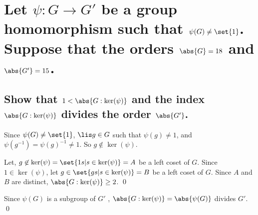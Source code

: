 \section[Problem 3]{Let $\psi : G \to G'$ be a group homomorphism such that
    $\psi(G) \neq \set{1}$. Suppose that the orders $\abs{G} = 18$ and $\abs{G'} = 15$.}
    \subsection[(i)]{Show that $1 < \abs{G:\ker(\psi)}$ and 
        the index $\abs{G:\ker(\psi)}$ divides the order $\abs{G'}$.}


        Since $\psi(G) \neq \set{1}$,
        $\lis g \in G$ such that $\psi(g) \neq 1$,
        and $\psi(g^{-1}) = \psi(g)^{-1} \neq 1$.
        So $g\not \in \ker(\psi)$.

        Let, $g\not\in \ker(\psi) = \set{1s | s \in \ker(\psi)} = A$ be a left coset of $G$.
        Since $1\in \ker(\psi)$, 
        let $g \in \set{g s | s \in \ker(\psi)} = B$ be a left coset of $G$.
        Since $A$ and $B$ are distinct, $\abs{G:\ker(\psi)} \geq 2$.
        \qed


        Since $\psi(G)$ is a subgroup of $G'$ , 
        $\abs{G: \ker(\psi)} = \abs{\psi(G)}$ divides $G'$.
        \qed









